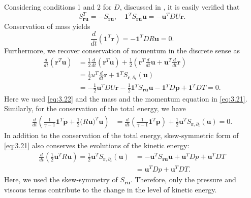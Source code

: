 Considering conditions 1 and 2 for $D$, discussed in , it is easily verified that
\begin{equation} \label{eq:3.22}
	S_{\mathbf r \mathbf u}^T = - S_{\mathbf r \mathbf u}, \quad \mathbf 1^T S_{\mathbf r \mathbf u} \mathbf u = - \mathbf u^T DU \mathbf r.
\end{equation}
Conservation of mass yields
\begin{equation} \label{eq:3.23}
	\frac{d}{dt} (\mathbf 1^T \mathbf r) = - \mathbf 1^T DR\mathbf u = 0. 
\end{equation}
Furthermore, we recover conservation of momentum in the discrete sense as
\begin{equation} \label{eq:3.24}
\begin{aligned}
	\frac{d}{dt}(\mathbf r^T \mathbf u) &= \frac{1}{2} \frac{d}{dt}(\mathbf r^T \mathbf u) + \frac{1}{2} \left( \mathbf r^T \frac d{dt} \mathbf u +\mathbf u^T \frac{d}{dt} \mathbf r \right)\\
	&= \frac{1}{2}u^T \frac d{dt} \mathbf r + \mathbf 1^T S_{\mathbf r,\partial_t} (\mathbf u) \\
	&= -\frac 1 2 \mathbf u^T DU \mathbf r  - \frac 1 2 \mathbf 1^T S_{\mathbf r \mathbf u} \mathbf u - \mathbf 1^T D\mathbf p +  \mathbf 1^T D T = 0.
\end{aligned}
\end{equation}
Here we used \eqref{eq:3.22} and the mass and the momentum equation in \eqref{eq:3.21}. Similarly, for the conservation of the total energy, we have
\begin{equation} \label{eq:3.25}
\begin{aligned}
	\frac{d}{dt} \left( \frac{1}{\gamma - 1} \mathbf 1^T \mathbf p + \frac 1 2 \mathbf (R\mathbf u)^T \mathbf u  \right) &= \frac{d}{dt} \left( \frac{1}{\gamma - 1} \mathbf 1^T \mathbf p \right) + \frac 1 2 \mathbf u^T  S_{\mathbf r,\partial_t} (\mathbf u) = 0.
\end{aligned}
\end{equation}
In addition to the conservation of the total energy, skew-symmetric form of \eqref{eq:3.21} also conserves the evolutions of the kinetic energy:
\begin{equation} \label{eq:3.26}
\begin{aligned}
	\frac{d}{dt} ( \frac 1 2 \mathbf u^T R\mathbf u) = \frac 1 2 \mathbf u^T S_{\mathbf r,\partial_t} (\mathbf u) &= -\mathbf u ^T S_{\mathbf r \mathbf u} \mathbf u + \mathbf u^T D p + \mathbf u^T DT \\
	&= \mathbf u^T D p + \mathbf u^T DT.
\end{aligned}
\end{equation}
Here, we used the skew-symmetry of $S_{\mathbf r \mathbf u}$. Therefore, only the pressure and viscous terms contribute to the change in the level of kinetic energy.


